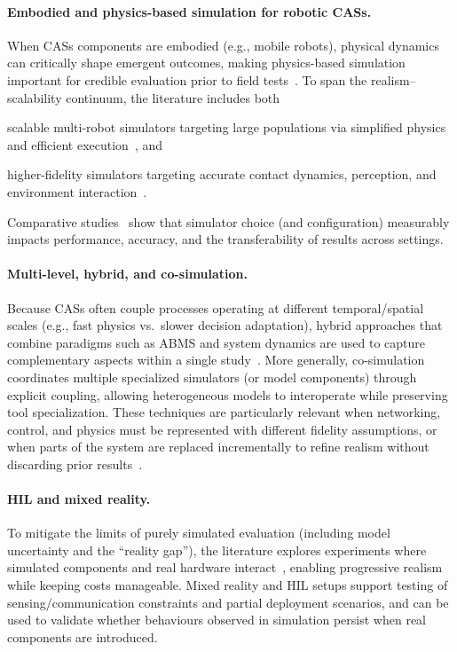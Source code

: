 \documentclass[runningheads]{llncs}
\newenvironment{inlinelist}{\begin{enumerate*}[label=\emph{(\roman*)}]}{\end{enumerate*}}
\begin{document}
\paragraph{Embodied and physics-based simulation for robotic \acp{CAS}.}
When \acp{CAS} components are embodied (e.g., mobile robots),
physical dynamics can critically shape emergent outcomes,
making physics-based simulation important for credible evaluation prior to field tests~\cite{DBLP:journals/swarm/BrambillaFBD13,DBLP:journals/computation/Calderon-ArceBS22}.
%
To span the realism--scalability continuum,
the literature includes both
\begin{inlinelist}
    \item scalable multi-robot simulators targeting large populations via simplified physics and efficient execution~\cite{DBLP:journals/swarm/PinciroliTOPBBMFCDBGD12}, and
     \item higher-fidelity simulators targeting accurate contact dynamics, perception, and environment interaction~\cite{DBLP:conf/iros/KoenigH04}.
\end{inlinelist}
%
Comparative studies~\cite{DBLP:journals/simpra/FarleyWM22,DBLP:journals/jirs/PlattR22}
show that simulator choice (and configuration) measurably impacts performance,
accuracy, and the transferability of results across settings.

\paragraph{Multi-level, hybrid, and co-simulation.}
Because \acp{CAS} often couple processes operating at different temporal/spatial scales
(e.g., fast physics vs.\ slower decision adaptation),
hybrid approaches that combine paradigms such as \ac{ABMS}
and system dynamics are used to capture complementary aspects within a single study~\cite{DBLP:journals/eor/NguyenHM24}.
%
More generally,
co-simulation~\cite{DBLP:journals/csur/GomesTBLV18} coordinates multiple specialized simulators (or model components) through explicit coupling,
allowing heterogeneous models to interoperate while preserving tool specialization.
%
These techniques are particularly relevant when networking, control,
and physics must be represented with different fidelity assumptions,
or when parts of the system are replaced incrementally to refine realism without discarding prior results~\cite{MittalRiscoMartin2017SimBasedCAS}.

\paragraph{\acl{HIL} and mixed reality.}
To mitigate the limits of purely simulated evaluation (including model uncertainty and the ``reality gap''),
the literature explores experiments where simulated components and real hardware interact~\cite{Sende2024},
enabling progressive realism while keeping costs manageable.
%
Mixed reality and \ac{HIL} setups support testing of sensing/communication constraints and partial deployment scenarios,
and can be used to validate whether behaviours observed in simulation persist when real components are introduced.
\end{document}
